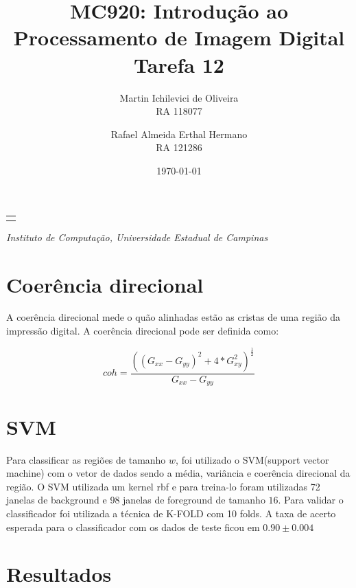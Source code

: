 \documentclass[10pt,a4paper]{article}
\makeatletter
\let\@institution\empty
\def\institution#1{\def\@institution{#1}}
\renewcommand{\maketitle}{
    \begin{center}
        {\Large\bfseries\@title\par\medskip}
        {\large
            \begin{tabular}[t]{c}%
                \@author
        \end{tabular}\par\medskip}
        {\itshape\@institution\par}
        {\itshape\@date\par}
\end{center}}
\makeatother
\begin{document}

\title{MC920: Introdução ao Processamento de Imagem Digital\\Tarefa 12}
\author{
    \begin{minipage}{6cm}
        \centering
        Martin Ichilevici de Oliveira\\
        RA 118077
    \end{minipage}
    \and
    \begin{minipage}{6cm}
        \centering
        Rafael Almeida Erthal Hermano\\
        RA 121286
    \end{minipage}
}
\institution{Instituto de Computação, Universidade Estadual de Campinas}
\date{\today}

\maketitle

\section{Coerência direcional}
A coerência direcional mede o quão alinhadas estão as cristas de uma região da impressão digital. A coerência direcional pode ser definida como:

\begin{equation}
    coh = \frac{((G_{xx} - G_{yy})^2 + 4 * G_{xy}^2)^{\frac{1}{2}}}{G_{xx} - G_{yy}}
\end{equation}

\section{SVM}
Para classificar as regiões de tamanho $w$, foi utilizado o SVM(support vector machine) com o vetor de dados sendo a média, variância e coerência direcional da região. O SVM utilizada um kernel rbf e para treina-lo foram utilizadas 72 janelas de background e 98 janelas de foreground de tamanho $16$. Para validar o classificador foi utilizada a técnica de K-FOLD com 10 folds. A taxa de acerto esperada para o classificador com os dados de teste ficou em $0.90 \pm 0.004$

\section{Resultados}
\end{document}
